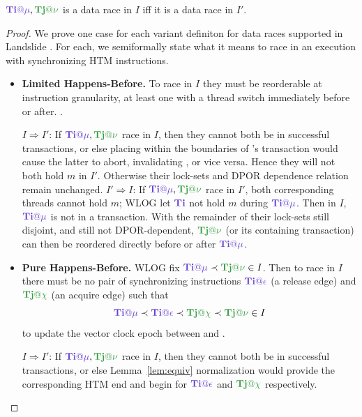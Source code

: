 \documentclass{article}
\begin{document}
\begin{theorem}
	$\tiiat{\mu},\tjjat{\nu}$ is a data race in $I$ iff it is a data race in $I'$.
\end{theorem}

\begin{proof}
We prove one case for each variant definiton for data races supported in Landslide \cite{quicksand}.
For each, we semiformally state what it means to race in an execution with synchronizing HTM instructions.

\begin{itemize}
	\item {\bf Limited Happens-Before.}
		To race in $I$ they must be reorderable at instruction granularity,
		at least one with a thread switch immediately before or after.
		\cite{tsan,hybriddatarace}.
		\begin{itemize}
			\llitem $I \Rightarrow I'$:
				If $\tiiat{\mu},\tjjat{\nu}$ race in $I$,
				then they cannot both be in successful transactions,
				or else placing \tiiat{\mu} within the boundaries of \tjjat{\nu}'s transaction
				would cause the latter to abort, invalidating \tjjat{\nu}, or vice versa.
				Hence they will not both hold $m$ in $I'$.
				Otherwise their lock-sets and DPOR dependence relation remain unchanged.
			\llitem $I' \Rightarrow I$:
				If $\tiiat{\mu},\tjjat{\nu}$ race in $I'$,
				both corresponding threads cannot hold $m$;
				WLOG let $\tii$ not hold $m$ during $\tiiat{\mu}$.
				Then in $I$, $\tiiat{\mu}$ is not in a transaction.
				With the remainder of their lock-sets still disjoint,
				and still not DPOR-dependent, $\tjjat{\nu}$ (or its containing transaction)
				can then be reordered directly before or after $\tiiat{\mu}$.
		\end{itemize}
	\item {\bf Pure Happens-Before.}
		WLOG fix $\tiiat{\mu} \prec \tjjat{\nu} \in I$.
		Then to race in $I$ there must be no pair of synchronizing instructions
		$\tiiat{\epsilon}$ (a release edge) and $\tjjat{\chi}$ (an acquire edge) such that
		\[
			\tiiat{\mu} \prec \tiiat{\epsilon} \prec \tjjat{\chi} \prec \tjjat{\nu} \in I
		\]
		to update the vector clock epoch between \tiiat{\mu} and \tjjat{\nu} \cite{djit,fasttrack}.
		\begin{itemize}
			\llitem $I \Rightarrow I'$:
				If $\tiiat{\mu},\tjjat{\nu}$ race in $I$,
				then they cannot both be in successful transactions,
				or else Lemma~\ref{lem:equiv} normalization would provide
				the corresponding HTM end and begin for $\tiiat{\epsilon}$ and $\tjjat{\chi}$ respectively.

\end{itemize}
\end{itemize}
\end{proof}
\end{document}
